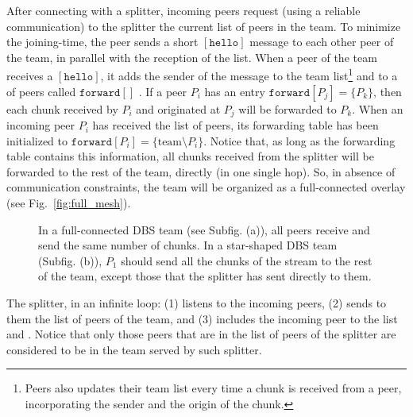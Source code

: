 

\label{sec:joining}

After connecting with a splitter, incoming peers request (using a
reliable communication) to the splitter the current list of peers in
the team. To minimize the \gls{joining-time}, the peer sends a short
$[\mathtt{hello}]$ message to each other peer of the team, in parallel
with the reception of the list. When a peer of the team receives a
$[\mathtt{hello}]$, it adds the sender of the message to the team
list\footnote{Peers also updates their team list every time a chunk is
  received from a peer, incorporating the sender and the origin of the
  chunk.}  and to a  of peers called $\mathtt{forward}[]$
. If a peer $P_i$ has an entry
$\mathtt{forward}[P_j]=\{P_k\}$, then each chunk received by $P_i$ and
originated at $P_j$ will be forwarded to $P_k$. When an incoming peer
$P_i$ has received the list of peers, its forwarding table has been
initialized to $\mathtt{forward}[P_i]=\{\text{team}\setminus
P_i\}$. Notice that, as long as the forwarding table contains this
information, all chunks received from the splitter will be forwarded
to the rest of the team, directly (in one single hop). So, in absence
of communication constraints, the team will be organized as a
full-connected overlay (see Fig.~\ref{fig:full_mesh}).
%
\begin{figure*}[h!]
  \centering
  \quad
  \caption{In a full-connected DBS team (see Subfig. (a)), all peers
    receive and send the same number of chunks. In a star-shaped DBS
    team (Subfig. (b)), $P_1$ should send all the chunks of the stream
    to the rest of the team, except those that the splitter has sent
    directly to them.}
\end{figure*}
%


The splitter, in an infinite loop: (1) listens to the incoming peers,
(2) sends to them the list of peers of the team, and (3) includes the
incoming peer to the list and . Notice that only those peers that are in
the list of peers of the splitter are considered to be in the team
served by such splitter.

